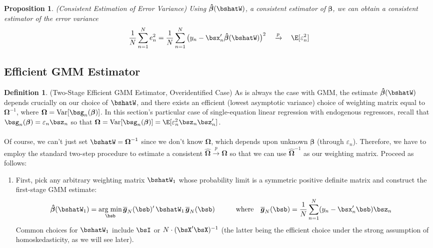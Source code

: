 \documentclass[12pt]{article}
\theoremstyle{plain}
\newtheorem{prop}[thm]{Proposition}
\theoremstyle{definition}
\newtheorem{defn}[thm]{Definition}
\theoremstyle{remark}
\newcommand{\bsbeta}{\boldsymbol{\beta}}
\newcommand{\bsOmega}{\boldsymbol{\Omega}}
\newcommand{\bshatbeta}{\boldsymbol{\hat{\beta}}}
\newcommand{\bshatOmega}{\boldsymbol{\hat{\Omega}}}
\newcommand{\bsbarg}{\boldsymbol{\overline{g}}}
\DeclareMathOperator*{\argmin}{arg\;min}
\newcommand{\Var}{\operatorname{Var}}
\newcommand{\pto}{\xrightarrow{p}}
\newcommand{\sumnN}{\sum^N_{n=1}}
\begin{document}
\begin{prop}\emph{(Consistent Estimation of Error Variance)}
Using $\bshatbeta(\bshatW)$, a consistent estimator of $\bsbeta$, we can
obtain a consistent estimator of the error variance
\begin{align*}
  \frac{1}{N} \sumnN e_n^2
  =
  \frac{1}{N} \sumnN \big(y_n - \bsx_n'\bshatbeta(\bshatW)\big)^2
  \quad\pto\quad
  \E[\varepsilon_n^2]
\end{align*}
\end{prop}


\clearpage
\subsection{Efficient GMM Estimator}

\begin{defn}(Two-Stage Efficient GMM Estimator, Overidentified Case)
As is always the case with GMM, the estimate $\bshatbeta(\bshatW)$
depends crucially on our choice of $\bshatW$, and there exists an
efficient (lowest asymptotic variance) choice of weighting matrix equal
to $\bsOmega^{-1}$, where $\bsOmega=\Var[\bsg_n(\bsbeta)]$. In this
section's particular case of single-equation linear regression with
endogenous regressors, recall that $\bsg_n(\bsbeta)=\varepsilon_n\bsz_n$
so that $\bsOmega=\Var[\bsg_n(\bsbeta)]
=\E[\varepsilon^2_n\bsz_n\bsz_n']$.
\\
\\
Of course, we can't just set $\bshatW=\bsOmega^{-1}$ since we don't know
$\bsOmega$, which depends upon unknown $\bsbeta$ (through
$\varepsilon_n$). Therefore, we have to employ the standard two-step
procedure to estimate a consistent $\bshatOmega\pto\bsOmega$ so that we
can use $\bshatOmega^{-1}$ as our weighting matrix. Proceed as follows:
\begin{enumerate}[label=(\roman*)]
  \item First, pick any arbitrary weighting matrix $\bshatW_1$ whose
    probability limit is a symmetric positive definite matrix and
    construct the first-stage GMM estimate:
    \begin{align*}
      \bshatbeta(\bshatW_1) &=
      \argmin_{\bsb}
      \bsbarg_N(\bsb)' \, \bshatW_1 \, \bsbarg_N(\bsb)
      \qquad\quad
      \text{where}\quad
      \bsbarg_N(\bsb)
      = \frac{1}{N} \sumnN (y_n-\bsx_n'\bsb) \bsz_n
    \end{align*}
    Common choices for $\bshatW_1$ include $\bsI$ or $N\cdot
    (\bsX'\bsX)^{-1}$ (the latter being the efficient choice under
    the strong assumption of homoskedasticity, as we will see later).


\end{enumerate}
\end{defn}
\end{document}
